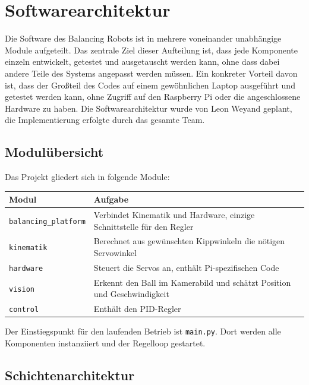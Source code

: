 \documentclass[11pt, a4paper]{scrreprt}
\begin{document}
\chapter{Softwarearchitektur}

Die Software des Balancing Robots ist in mehrere voneinander unabhängige
Module aufgeteilt. Das zentrale Ziel dieser Aufteilung ist, dass jede
Komponente einzeln entwickelt, getestet und ausgetauscht werden kann,
ohne dass dabei andere Teile des Systems angepasst werden müssen.
Ein konkreter Vorteil davon ist, dass der Großteil des Codes auf einem
gewöhnlichen Laptop ausgeführt und getestet werden kann, ohne Zugriff
auf den Raspberry Pi oder die angeschlossene Hardware zu haben. Die Softwarearchitektur wurde von Leon Weyand geplant, die Implementierung erfolgte durch das gesamte Team.

\section{Modulübersicht}

Das Projekt gliedert sich in folgende Module:

\begin{center}
\begin{tabular}{ll}
  \toprule
  Modul & Aufgabe \\
  \midrule
  \texttt{balancing\_platform} & Verbindet Kinematik und Hardware, einzige Schnittstelle für den Regler \\
  \texttt{kinematik}           & Berechnet aus gewünschten Kippwinkeln die nötigen Servowinkel \\
  \texttt{hardware}            & Steuert die Servos an, enthält Pi-spezifischen Code \\
  \texttt{vision}              & Erkennt den Ball im Kamerabild und schätzt Position und Geschwindigkeit \\
  \texttt{control}             & Enthält den PID-Regler \\
  \bottomrule
\end{tabular}
\end{center}

Der Einstiegspunkt für den laufenden Betrieb ist \texttt{main.py}.
Dort werden alle Komponenten instanziiert und der Regelloop gestartet.

\section{Schichtenarchitektur}
\end{document}

